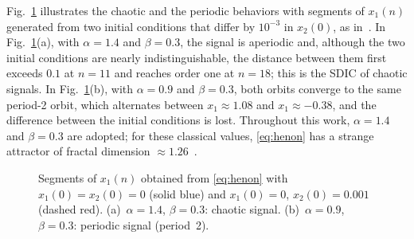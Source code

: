 \documentclass[journal]{IEEEtran}
\begin{document}
Fig.~\ref{fig:henon} illustrates the chaotic and the periodic behaviors with
segments of $x_1(n)$ generated from two initial conditions that differ by
$10^{-3}$ in $x_2(0)$, as in~\cite{Borges2022sbrt}. In
Fig.~\ref{fig:henon}(a), with $\alpha=1.4$ and $\beta=0.3$, the signal is
aperiodic and, although the two initial conditions are nearly
indistinguishable, the distance between them first exceeds $0.1$ at $n=11$
and reaches order one at $n=18$; this is the SDIC of chaotic signals. In Fig.~\ref{fig:henon}(b),
with $\alpha=0.9$ and $\beta=0.3$, both orbits converge to the same period-2
orbit, which alternates between $x_1\approx1.08$ and $x_1\approx-0.38$, and
the difference between the initial conditions is lost.
Throughout this work, $\alpha=1.4$ and $\beta=0.3$ are adopted; for these
classical values, \eqref{eq:henon} has a strange attractor of fractal
dimension $\approx1.26$~\cite{Sprott2003}.

\begin{figure}[!t]
\centering

\caption{Segments of $x_1(n)$ obtained from \eqref{eq:henon} with
$x_1(0)=x_2(0)=0$ (solid blue) and $x_1(0)=0$, $x_2(0)=0.001$ (dashed red).
(a)~$\alpha=1.4$, $\beta=0.3$: chaotic signal. (b)~$\alpha=0.9$, $\beta=0.3$:
periodic signal (period~2).}
\label{fig:henon}
\end{figure}

\end{document}
